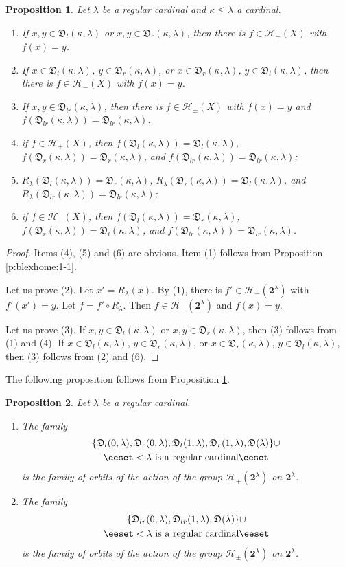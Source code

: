 \documentclass[preprint]{elsarticle}
\def\la{\lambda}
\def\ka{\kappa}
\def\cH{\mathcal{H}}
\def\set#1{\bbset#1\eeset}
\def\bbset#1:#2\eeset{\{#1\,:\,#2\}}
\newtheorem{proposition}{Proposition}[section]
\theoremstyle{definition}
\theoremstyle{remark}
\def\lex#1#2{\mathfrak{L}(#2^{#1})}
\def\lex#1#2{#2^{#1}}
\def\homg#1,#2#3{\mathfrak{D}_{#1}(#2,#3)}
\def\homm#1{{\mathfrak{D}(#1)}}
\def\B{2}
\def\B{\mathsf{2}}
\def\B{\mathbf{2}}
\def\lexab{\lex\la\B}
\def\oip#1{\cH_{+}(#1)}
\def\oim#1{\cH_{-}(#1)}
\def\oipm#1{\cH_{\pm}(#1)}
\begin{document}
\begin{proposition}\label{p:blexhome:1}
Let $\la$ be a regular cardinal and $\ka\leq\la$ a cardinal.
\begin{enumerate}
\item
If $x,y\in \homg l,\ka\la$ or $x,y\in \homg r,\ka\la$, then there is $f\in\oip X$ with $f(x)=y$.
\item
If $x\in \homg l,\ka\la$, $y\in \homg r,\ka\la$, or $x\in \homg r,\ka\la$, $y\in \homg l,\ka\la$, then there is $f\in\oim X$ with $f(x)=y$.
\item
If $x,y\in \homg lr,\ka\la$, then there is $f\in\oipm X$ with $f(x)=y$ and $f(\homg lr,\ka\la)=\homg lr,\ka\la$.
\item
if $f\in\oip X$, then $f(\homg l,\ka\la)=\homg l,\ka\la$, $f(\homg r,\ka\la)=\homg r,\ka\la$, and $f(\homg lr,\ka\la)=\homg lr,\ka\la$;
\item
$R_\la(\homg l,\ka\la)=\homg r,\ka\la$, $R_\la(\homg r,\ka\la)=\homg l,\ka\la$, and $R_\la(\homg lr,\ka\la)=\homg lr,\ka\la$;
\item
if $f\in\oim X$, then $f(\homg l,\ka\la)=\homg r,\ka\la$, $f(\homg r,\ka\la)=\homg l,\ka\la$, and $f(\homg lr,\ka\la)=\homg lr,\ka\la$.
\end{enumerate}
\end{proposition}
\begin{proof}
Items (4), (5) and (6) are obvious. Item (1) follows from Proposition \ref{p:blexhome:1-1}.

Let us prove (2). Let $x'=R_\la(x)$. By (1), there is $f'\in\oip \lexab$ with $f'(x')=y$. Let $f = f' \circ R_\la$. Then $f\in\oim \lexab$ and $f(x)=y$.

Let us prove (3). If $x,y\in \homg l,\ka\la$ or $x,y\in \homg r,\ka\la$, then (3) follows from (1) and (4).
If $x\in \homg l,\ka\la$, $y\in \homg r,\ka\la$, or $x\in \homg r,\ka\la$, $y\in \homg l,\ka\la$, then (3) follows from (2) and (6).
\end{proof}

The following proposition follows from Proposition \ref{p:blexhome:1}.

\begin{proposition}\label{p:blexhome:2}
Let $\la$ be a regular cardinal.
\begin{enumerate}
\item
The family
\begin{gather*}
\{ \homg l,0\la, \homg r,0\la, \homg l,1\la, \homg r,1\la, \homm\la \} \cup 
\\
\set{\homg l,\ka\la, \homg r,\ka\la: \ka<\la\text{ is a regular cardinal}}
\end{gather*}
is the family of orbits of the action of the group $\oip\lexab$ on $\lexab$.
\item
The family
\begin{gather*}
\{ \homg lr,0\la,  \homg lr,1\la, \homm\la \} \cup 
\\
\set{\homg lr,\ka\la: \ka<\la\text{ is a regular cardinal}}
\end{gather*}
is the family of orbits of the action of the group $\oipm\lexab$ on $\lexab$.
\end{enumerate}
\end{proposition}
\end{document}
